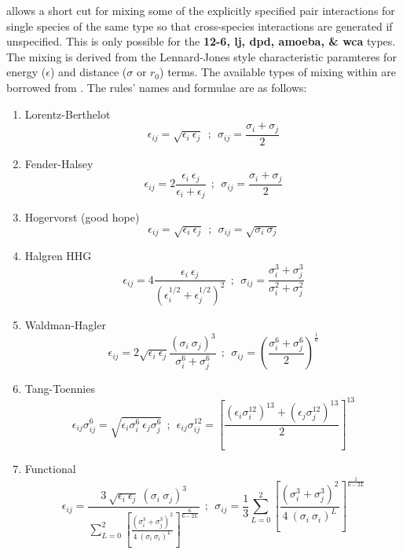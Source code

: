 \D allows a short cut for mixing some of the explicitly specified
pair interactions for single species of the same type so that
cross-species interactions are generated if unspecified.  This is
only possible for the {\bf 12-6, lj, dpd, amoeba, \& wca} types.
The mixing is derived from the Lennard-Jones style characteristic
paramteres for energy ($\epsilon$) and distance ($\sigma$ or $r_{0}$)
terms.  The available types of mixing within \D are borrowed from
\cite{al-matar-04a}. The rules' names and formulae are as follows:
\begin{enumerate}
\item Lorentz-Berthelot
\begin{equation}
\epsilon_{ij} = \sqrt{\epsilon_{i}~\epsilon_{j}}~~;~~\sigma_{ij} = \frac{\sigma_{i}+\sigma_{j}}{2}
\end{equation}
\item Fender-Halsey
\begin{equation}
\epsilon_{ij} = 2 \frac{\epsilon_{i}~\epsilon_{j}}{\epsilon_{i}+\epsilon_{j}}~~;~~\sigma_{ij} = \frac{\sigma_{i}+\sigma_{j}}{2}
\end{equation}
\item Hogervorst (good hope)
\begin{equation}
\epsilon_{ij} = \sqrt{\epsilon_{i}~\epsilon_{j}}~~;~~\sigma_{ij} = \sqrt{\sigma_{i}~\sigma_{j}}
\end{equation}
\item Halgren HHG
\begin{equation}
\epsilon_{ij} = 4 \frac{\epsilon_{i}~\epsilon_{j}}{\left(\epsilon_{i}^{1/2}+\epsilon_{j}^{1/2}\right)^{2}}~~;~~\sigma_{ij} = \frac{\sigma_{i}^{3}+\sigma_{j}^{3}}{\sigma_{i}^{2}+\sigma_{j}^{2}}
\end{equation}
\item Waldman-Hagler
\begin{equation}
\epsilon_{ij} = 2 \sqrt{\epsilon_{i}~\epsilon_{j}} \frac{(\sigma_{i}~\sigma_{j})^{3}}{\sigma_{i}^{6}+\sigma_{j}^{6}}~~;~~\sigma_{ij} = \left(\frac{\sigma_{i}^{6}+\sigma_{j}^{6}}{2}\right)^{\frac{1}{6}}
\end{equation}
\item Tang-Toennies
\begin{equation}
\epsilon_{ij} \sigma_{ij}^{6} = \sqrt{\epsilon_{i} \sigma_{i}^{6}~\epsilon_{j} \sigma_{j}^{6}}~~;~~\epsilon_{ij} \sigma_{ij}^{12}=\left[\frac{\left(\epsilon_{i} \sigma_{i}^{12}\right)^{13}+\left(\epsilon_{j} \sigma_{j}^{12}\right)^{13}}{2}\right]^{13}
\end{equation}
\item Functional
\begin{equation}
\epsilon_{ij} = \frac{3~\sqrt{\epsilon_{i}~\epsilon_{j}}~(\sigma_{i}~\sigma_{j})^{3}}
{\sum\limits_{L=0}^{2}{\left[\frac{\left(\sigma_{i}^{3}+\sigma_{j}^{3}\right)^{2}}{4~(\sigma_{i}~\sigma_{i})^{L}}\right]^{\frac{6}{6-2L}}}}~~;~~\sigma_{ij}=\frac{1}{3}\sum\limits_{L=0}^{2}{\left[\frac{\left(\sigma_{i}^{3}+\sigma_{j}^{3}\right)^{2}}{4~(\sigma_{i}~\sigma_{i})^{L}}\right]^{\frac{1}{6-2L}}}
\end{equation}
\end{enumerate}

